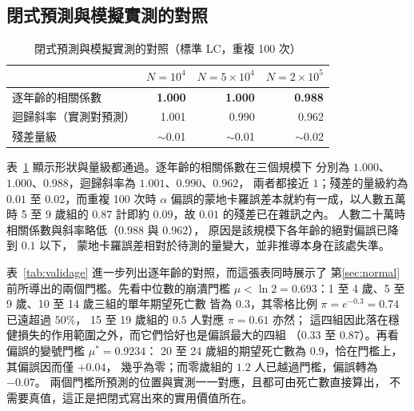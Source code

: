 \documentclass[UTF8, fontset=macnew, a4paper, 12pt]{ctexart}
\begin{document}
\subsection{閉式預測與模擬實測的對照}

\begin{table}[H]
\centering
\caption{閉式預測與模擬實測的對照（標準 LC，重複 100 次）}
\small
\begin{tabular}{lrrr}
\toprule
 & $N=10^4$ & $N=5\times10^4$ & $N=2\times10^5$\\
\midrule
逐年齡的相關係數 & \textbf{1.000} & \textbf{1.000} & \textbf{0.988}\\
迴歸斜率（實測對預測） & 1.001 & 0.990 & 0.962\\
殘差量級 & $\sim$0.01 & $\sim$0.01 & $\sim$0.02\\
\bottomrule
\end{tabular}
\label{tab:valid}
\end{table}

表~\ref{tab:valid} 顯示形狀與量級都通過。逐年齡的相關係數在三個規模下
分別為 $1.000$、$1.000$、$0.988$，迴歸斜率為 $1.001$、$0.990$、$0.962$，
兩者都接近 $1$；殘差的量級約為 $0.01$ 至 $0.02$，而重複 100 次時
$\alpha$ 偏誤的蒙地卡羅誤差本就約有一成，以人數五萬時 5 至 9 歲組的
$0.87$ 計即約 $0.09$，故 $0.01$ 的殘差已在雜訊之內。
人數二十萬時相關係數與斜率略低（$0.988$ 與 $0.962$），
原因是該規模下各年齡的絕對偏誤已降到 $0.1$ 以下，
蒙地卡羅誤差相對於待測的量變大，並非推導本身在該處失準。

表~\ref{tab:validage} 進一步列出逐年齡的對照，而這張表同時展示了
第\ref{sec:normal}前所導出的兩個門檻。先看中位數的崩潰門檻
$\mu<\ln2=0.693$：1 至 4 歲、5 至 9 歲、10 至 14 歲三組的單年期望死亡數
皆為 $0.3$，其零格比例 $\pi=e^{-0.3}=0.74$ 已遠超過 $50\%$，
15 至 19 歲組的 $0.5$ 人對應 $\pi=0.61$ 亦然；
這四組因此落在穩健損失的作用範圍之外，而它們恰好也是偏誤最大的四組
（$0.33$ 至 $0.87$）。再看偏誤的變號門檻 $\mu^\ast=0.9234$：
20 至 24 歲組的期望死亡數為 $0.9$，恰在門檻上，其偏誤因而僅 $+0.04$，
幾乎為零；而零歲組的 $1.2$ 人已越過門檻，偏誤轉為 $-0.07$。
兩個門檻所預測的位置與實測一一對應，且都可由死亡數直接算出，
不需要真值，這正是把閉式寫出來的實用價值所在。
\end{document}
